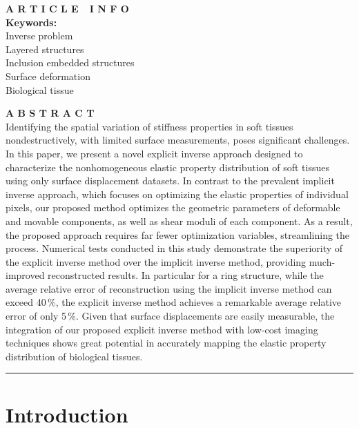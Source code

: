 \documentclass[11pt]{article}
\begin{document}
\noindent
\begin{minipage}[t]{0.30\textwidth}
\textbf{A R T I C L E\ \ I N F O}\\[0.8em]
\textbf{Keywords:}\\
Inverse problem\\
Layered structures\\
Inclusion embedded structures\\
Surface deformation\\
Biological tissue
\end{minipage}
\hfill
\begin{minipage}[t]{0.66\textwidth}
\textbf{A B S T R A C T}\\[0.8em]
Identifying the spatial variation of stiffness properties in soft
tissues nondestructively, with limited surface measurements, poses
significant challenges. In this paper, we present a novel explicit
inverse approach designed to characterize the nonhomogeneous elastic
property distribution of soft tissues using only surface displacement
datasets. In contrast to the prevalent implicit inverse approach,
which focuses on optimizing the elastic properties of individual
pixels, our proposed method optimizes the geometric parameters of
deformable and movable components, as well as shear moduli of each
component. As a result, the proposed approach requires far fewer
optimization variables, streamlining the process. Numerical tests
conducted in this study demonstrate the superiority of the explicit
inverse method over the implicit inverse method, providing
much-improved reconstructed results. In particular for a ring
structure, while the average relative error of reconstruction using
the implicit inverse method can exceed 40\,\%, the explicit inverse
method achieves a remarkable average relative error of only 5\,\%.
Given that surface displacements are easily measurable, the
integration of our proposed explicit inverse method with low-cost
imaging techniques shows great potential in accurately mapping the
elastic property distribution of biological tissues.
\end{minipage}

\vspace{1.2em}
\hrule
\vspace{0.8em}

\section*{Introduction}
\end{document}
